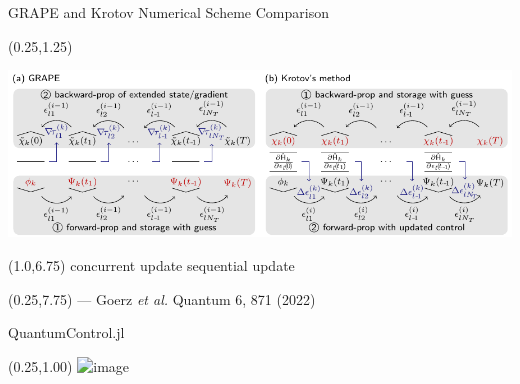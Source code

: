 \documentclass[compress, aspectratio=169]{beamer}
\begin{document}
\begin{frame}{GRAPE and Krotov Numerical Scheme Comparison}
  \begin{textblock}{15.5}(0.25,1.25)
    \begin{center}
      \includegraphics{images/schemes_comparison}
    \end{center}
  \end{textblock}
  \begin{textblock}{14}(1.0,6.75)
    concurrent update \hfill sequential update
  \end{textblock}
  \begin{textblock}{15.5}(0.25,7.75)
    \hfill \footnotesize{--- Goerz \emph{et al.} Quantum 6, 871 (2022)}
  \end{textblock}
\end{frame}


\begin{frame}{QuantumControl.jl}
  \begin{textblock}{15.5}(0.25,1.00)
    \includegraphics<1>[width=\textwidth]{images/JuliaQuantumControl}
  \end{textblock}
\end{frame}
\end{document}
